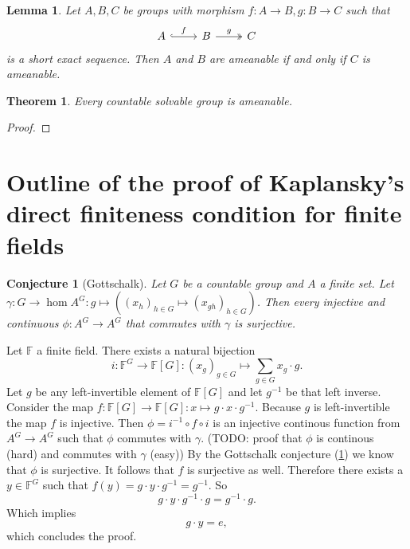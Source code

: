 \documentclass[a4paper]{report}
\newcommand{\F}{\mathbb{F}}
\newtheorem{theorem}{Theorem}
\newtheorem{lemma}{Lemma}
\newtheorem{conjecture}{Conjecture}
\begin{document}
    \begin{lemma}
        \label{lem:ameanable_short_exact_sequence}
        Let $A, B, C$ be groups with morphism $f:A\to B, g:B\to C$ such that
        \[\begin{tikzcd}
            A \arrow[r, "f", hook] & B \arrow[r, "g", two heads] & C
        \end{tikzcd}\] is a short exact sequence. Then $A$ and $B$ are ameanable if and only if $C$ is ameanable.
    \end{lemma}
    \begin{theorem}
        Every countable solvable group is ameanable. 
    \end{theorem}
    \begin{proof}
        
    \end{proof}
	\section{Outline of the proof of Kaplansky's direct finiteness condition for finite fields}
	\begin{conjecture}[Gottschalk] \label{conj:gottschalk}
		Let $G$ be a countable group and $A$ a finite set. 
		Let $\gamma: G\to \hom{A^{G}}:g \mapsto \left( (x_{h})_{h \in G} \mapsto \left( x_{gh} \right)_{h \in G}  \right)$.
		Then every injective and continuous $\phi: A^{G}\to A^{G}$ that commutes with $\gamma$ is surjective.
	\end{conjecture}

	Let $\F$ a finite field. There exists a natural bijection \[
		i:\F^{G}\to \F\left[ G \right]: \left( x_{g} \right)_{g\in G} \mapsto  \sum_{g\in G} x_g \cdot g .
	\] 
	Let $g$ be any left-invertible element of $\F[G]$ and let $g^{-1}$ be that left inverse. 
	Consider the map $f:\F[G] \to \F[G] : x \mapsto  g \cdot x \cdot g^{-1}$. 
	Because $ g$ is left-invertible the map $f$ is injective. 
	Then $\phi = i^{-1}\circ f \circ i$ is an injective continous function from $A^{G} \to A^{G}$ such that $\phi$ commutes with $\gamma$.
	(TODO: proof that $\phi$ is continous (hard) and commutes with $\gamma$ (easy))
	By the Gottschalk conjecture (\cref{conj:gottschalk}) we know that $\phi$ is surjective. 
	It follows that $f$ is surjective as well. Therefore there exists a $y \in \F^{G}$ such that $f(y) = g\cdot y \cdot g^{-1} = g^{-1}$. So \[
	g \cdot y \cdot g^{-1} \cdot g = g^{-1} \cdot g
	.\] 
	Which implies \[
	g\cdot y = e
	,\] 
	which concludes the proof.
	\printbibliography
\end{document}
